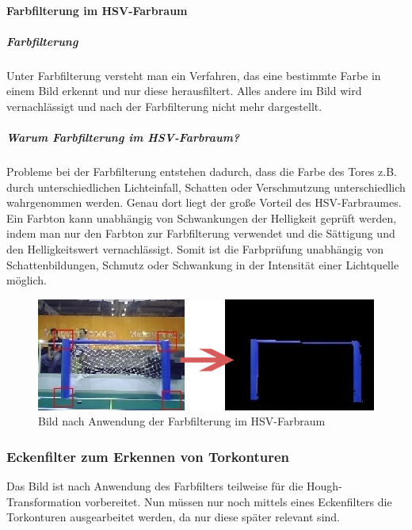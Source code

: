 \documentclass[a4paper,12pt]{article}
\begin{document}
\paragraph{Farbfilterung im HSV-Farbraum}
\subparagraph{Farbfilterung}
Unter Farbfilterung versteht man ein Verfahren, das eine bestimmte Farbe in einem Bild erkennt und nur
diese herausfiltert. Alles andere im Bild wird vernachlässigt und nach der Farbfilterung nicht mehr 
dargestellt.
\subparagraph{Warum Farbfilterung im HSV-Farbraum?}
Probleme bei der Farbfilterung entstehen dadurch, dass die Farbe des Tores z.B. durch
unterschiedlichen Lichteinfall, Schatten oder Verschmutzung unterschiedlich wahrgenommen werden.
Genau dort liegt der große Vorteil des HSV-Farbraumes. Ein Farbton kann unabhängig
von Schwankungen der Helligkeit geprüft werden, indem man nur den Farbton zur
Farbfilterung verwendet und die Sättigung und den Helligkeitswert vernachlässigt. Somit
ist die Farbprüfung unabhängig von Schattenbildungen, Schmutz oder Schwankung
in der Intensität einer Lichtquelle möglich.
\begin{figure}[H]
    \includegraphics[scale=0.6]{farb-filterung.jpg}
    \caption{Bild nach Anwendung der Farbfilterung im HSV-Farbraum}
    \label{fig:farb-filterung}
\end{figure}

\subsubsection{Eckenfilter zum Erkennen von Torkonturen} 
Das Bild ist nach Anwendung des Farbfilters teilweise für die Hough-Transformation vorbereitet.
Nun müssen nur noch mittels eines Eckenfilters die Torkonturen ausgearbeitet werden,
da nur diese später relevant sind.
\end{document}

